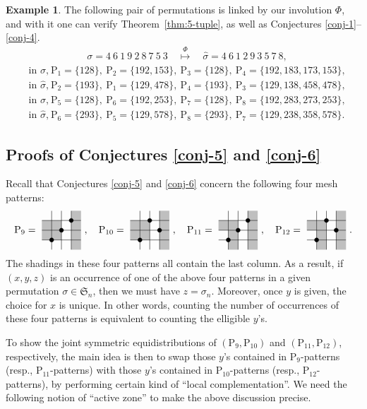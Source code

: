 \documentclass[12pt,reqno]{article}
\numberwithin{equation}{section}
\theoremstyle{plain}
\theoremstyle{definition}
\newtheorem{example}[theorem]{Example}
\def\fS{\mathfrak{S}}
\def\rP{\mathrm{P}}
\newcommand{\pattern}[4]{			
	\raisebox{0.6ex}{
		\begin{tikzpicture}[scale=0.35, baseline=(current bounding box.center), #1]
			\foreach \x/\y in {#4}		\fill[gray!50] (\x,\y) rectangle +(1,1);
			
			\draw (0.01,0.01) grid (#2+0.99,#2+0.99);
			\foreach \x/\y in {#3}		\filldraw (\x,\y) circle (6pt);
	\end{tikzpicture}}
}
\begin{document}
\begin{example}\label{p1p2exa}
The following pair of permutations is linked by our involution $\Phi$, and with it one can verify Theorem~\ref{thm:5-tuple}, as well as Conjectures \ref{conj-1}--\ref{conj-4}.
	\begin{align*}
		&\sigma =4 ~6 ~1 ~9 ~2 ~8 ~7 ~5 ~3\quad \stackrel{\Phi}{\longmapsto}\quad \hat{\sigma} =4 ~6 ~1 ~2 ~9 ~3 ~5 ~7 ~8,
	\end{align*}
	\begin{align*}
		&\text{in $\sigma$,}~\rP_{1}=\{128\},~\rP_{2}=\{192,153\},~\rP_{3}=\{128\},~\rP_{4}=\{192,183,173,153\},\\
		&\text{in $\hat{\sigma}$,}~\rP_{2}=\{193\},~\rP_{1}=\{129,478\},~\rP_{4}=\{193\},~\rP_{3}=\{129,138,458,478\},\\
		&\text{in $\sigma$,}~\rP_{5}=\{128\},~\rP_{6}=\{192,253\},~\rP_{7}=\{128\},~\rP_{8}=\{192,283,273,253\},\\
		&\text{in $\hat{\sigma}$,}~\rP_{6}=\{293\},~\rP_{5}=\{129,578\},~\rP_{8}=\{293\},~\rP_{7}=\{129,238,358,578\}.
	\end{align*}
\end{example}



\subsection{Proofs of Conjectures \ref{conj-5} and \ref{conj-6}}
Recall that Conjectures \ref{conj-5} and \ref{conj-6} concern the following four mesh patterns:
\begin{align*}
\rP_{9}=\pattern{scale=1}{3}{1/1,2/2,3/3}{0/1,0/2,1/1,1/2,3/0,3/1,3/2,3/3}\ ,\quad \rP_{10}=\pattern{scale=1}{3}{1/1,2/3,3/2}{0/1,0/2,1/1,1/2,3/0,3/1,3/2,3/3}\ ,\quad \rP_{11} =\pattern{scale=1}{3}{1/1,2/2,3/3}{1/0,0/2,1/1,1/2,3/0,3/1,3/2,3/3}\ ,\quad \rP_{12}=\pattern{scale=1}{3}{1/1,2/3,3/2}{1/0,0/2,1/1,1/2,3/0,3/1,3/2,3/3}\ .
\end{align*}
The shadings in these four patterns all contain the last column. As a result, if $(x,y,z)$ is an occurrence of one of the above four patterns in a given permutation $\sigma\in\fS_n$, then we must have $z=\sigma_n$. Moreover, once $y$ is given, the choice for $x$ is unique. In other words, counting the number of occurrences of these four patterns is equivalent to counting the elligible $y$'s. 

To show the joint symmetric equidistributions of $(\rP_9,\rP_{10})$ and $(\rP_{11},\rP_{12})$, respectively, the main idea is then to swap those $y$'s contained in $\rP_9$-patterns (resp., $\rP_{11}$-patterns) with those $y$'s contained in $\rP_{10}$-patterns (resp., $\rP_{12}$-patterns), by performing certain kind of ``local complementation''. We need the following notion of ``active zone'' to make the above discussion precise.
\end{document}
